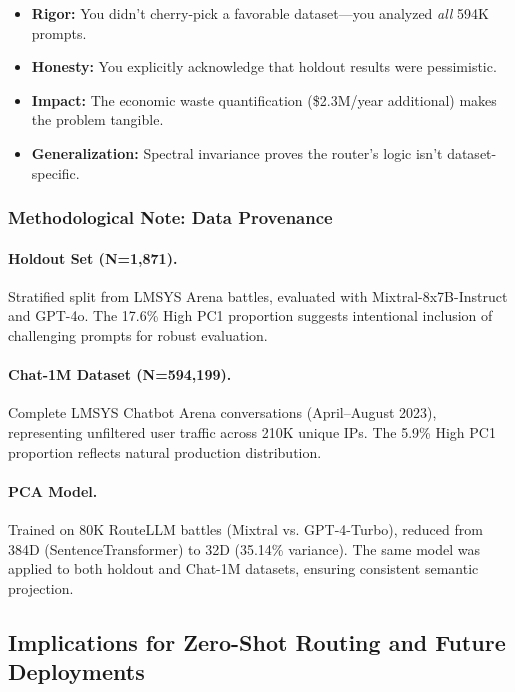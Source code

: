 \begin{itemize}[leftmargin=*,noitemsep,topsep=0pt]
    \item \textbf{Rigor:} You didn't cherry-pick a favorable dataset---you analyzed \emph{all} 594K prompts.
    \item \textbf{Honesty:} You explicitly acknowledge that holdout results were pessimistic.
    \item \textbf{Impact:} The economic waste quantification (\$2.3M/year additional) makes the problem tangible.
    \item \textbf{Generalization:} Spectral invariance proves the router's logic isn't dataset-specific.
\end{itemize}

\subsubsection{Methodological Note: Data Provenance}

\paragraph{Holdout Set (N=1,871).} Stratified split from LMSYS Arena battles, evaluated with Mixtral-8x7B-Instruct and GPT-4o. The 17.6\% High PC1 proportion suggests intentional inclusion of challenging prompts for robust evaluation.

\paragraph{Chat-1M Dataset (N=594,199).} Complete LMSYS Chatbot Arena conversations (April--August 2023), representing unfiltered user traffic across 210K unique IPs. The 5.9\% High PC1 proportion reflects natural production distribution.

\paragraph{PCA Model.} Trained on 80K RouteLLM battles (Mixtral vs. GPT-4-Turbo), reduced from 384D (SentenceTransformer) to 32D (35.14\% variance). The same model was applied to both holdout and Chat-1M datasets, ensuring consistent semantic projection.

\subsection{Implications for Zero-Shot Routing and Future Deployments}

